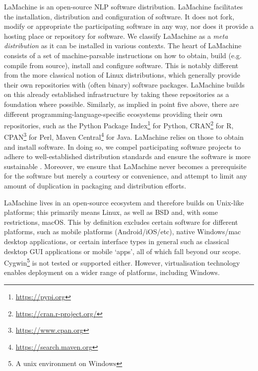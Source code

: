 \documentclass[a4paper,11pt]{article}
\begin{document}
LaMachine is an open-source NLP software distribution.  LaMachine facilitates the installation, distribution and configuration of software. It does not fork, modify or appropriate the participating software in any way, nor does it provide a hosting place or repository for software.
We classify LaMachine as a \emph{meta distribution} as it can be installed in various contexts. The heart of LaMachine consists of a
set of machine-parsable instructions on how to obtain, build (e.g. compile from source), install and configure software.
This is notably different from the more
classical notion of Linux distributions, which generally provide their own repositories with (often binary) software
packages. LaMachine builds on this already established infrastructure by taking these repositories as a foundation where
possible. Similarly, as implied in point five above, there are different programming-language-specific ecosystems
providing their own repositories, such as the Python Package Index\footnote{\url{https://pypi.org}} for Python,
CRAN\footnote{\url{https://cran.r-project.org/}} for R, CPAN\footnote{\url{https://www.cpan.org}} for Perl, Maven
Central\footnote{\url{https://search.maven.org}} for Java.  LaMachine relies on those to obtain and install software. In doing so, we compel participating software projects
to adhere to well-established distribution standards and ensure the software is more sustainable
\cite{softwarequality}. Moreover, we ensure that LaMachine never becomes a prerequisite for the software but merely a
courtesy or convenience, and attempt to limit any amount of duplication in packaging and distribution efforts.

LaMachine lives in an open-source ecosystem and therefore builds on Unix-like platforms; this primarily means Linux, as well as BSD and, with some restrictions, macOS. This by definition excludes certain software for different platforms, such as mobile platforms (Android/iOS/etc), native Windows/mac desktop applications, or certain interface types in general such as classical desktop GUI applications or mobile `apps', all of which fall beyond our scope. Cygwin\footnote{A unix environment on Windows} is not tested or
 supported either. However, virtualisation technology enables deployment on a wider range of platforms, including Windows.
\end{document}
